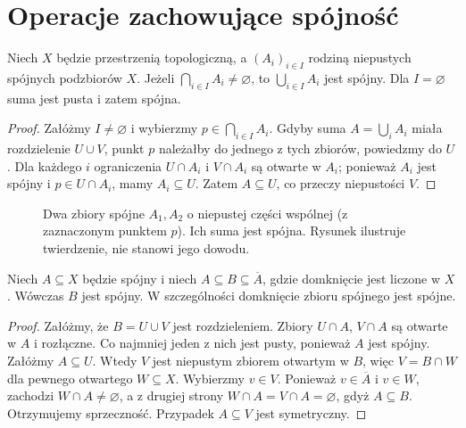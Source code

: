 \section{Operacje zachowujące spójność}
\label{sec:topog-spojnosc-operacje}

\begin{twierdzenie}
\label{thm:topog-spojnosc-suma}
Niech $X$ będzie przestrzenią topologiczną,
a $(A_i)_{i\in I}$ rodziną niepustych spójnych
podzbiorów $X$. Jeżeli $\bigcap_{i\in I}A_i\ne
\varnothing$, to $\bigcup_{i\in I}A_i$ jest spójny.
Dla $I=\varnothing$ suma jest pusta i zatem spójna.
\end{twierdzenie}
\begin{proof}
Załóżmy $I\ne\varnothing$ i wybierzmy
$p\in\bigcap_{i\in I}A_i$. Gdyby suma
$A=\bigcup_i A_i$ miała rozdzielenie $U\cup V$,
punkt $p$ należałby do jednego z tych zbiorów,
powiedzmy do $U$. Dla każdego $i$ ograniczenia
$U\cap A_i$ i $V\cap A_i$ są otwarte w $A_i$;
ponieważ $A_i$ jest spójny i $p\in U\cap A_i$,
mamy $A_i\subseteq U$. Zatem $A\subseteq U$,
co przeczy niepustości $V$.
\end{proof}

\begin{figure}[htbp]
\centering
{}
\caption{Dwa zbiory spójne $A_1,A_2$ o niepustej
części wspólnej (z zaznaczonym punktem $p$).
Ich suma jest spójna. Rysunek ilustruje
twierdzenie, nie stanowi jego dowodu.}
\label{fig:topog-spojnosc-suma}
\end{figure}

\begin{twierdzenie}
\label{thm:topog-spojnosc-domkniecie}
Niech $A\subseteq X$ będzie spójny i niech
$A\subseteq B\subseteq\overline A$, gdzie
domknięcie jest liczone w $X$. Wówczas $B$
jest spójny. W szczególności domknięcie
zbioru spójnego jest spójne.
\end{twierdzenie}
\begin{proof}
Załóżmy, że $B=U\cup V$ jest rozdzieleniem.
Zbiory $U\cap A$, $V\cap A$ są otwarte w $A$
i rozłączne. Co najmniej jeden z nich
jest pusty, ponieważ $A$ jest spójny.
Załóżmy $A\subseteq U$. Wtedy $V$ jest
niepustym zbiorem otwartym w $B$, więc
$V=B\cap W$ dla pewnego otwartego $W\subseteq X$.
Wybierzmy $v\in V$. Ponieważ $v\in\overline A$
i $v\in W$, zachodzi $W\cap A\ne\varnothing$,
a z drugiej strony $W\cap A=V\cap A=\varnothing$,
gdyż $A\subseteq B$. Otrzymujemy sprzeczność.
Przypadek $A\subseteq V$ jest symetryczny.
\end{proof}

